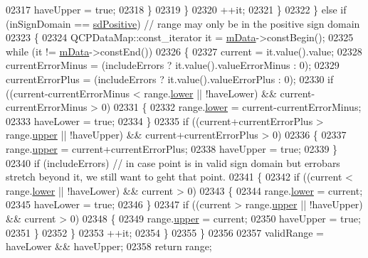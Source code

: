 \begin{DoxyCode}
02317           haveUpper = \textcolor{keyword}{true};
02318         \}
02319       \}
02320       ++it;
02321     \}
02322   \} \textcolor{keywordflow}{else} \textcolor{keywordflow}{if} (inSignDomain == \hyperlink{a00024_a661743478a1d3c09d28ec2711d7653d8a02951859f243a4d24e779cfbb5471030}{sdPositive}) \textcolor{comment}{// range may only be in the positive sign domain}
02323   \{
02324     QCPDataMap::const\_iterator it = \hyperlink{a00031_a8457c840f69a0ac49f61d30a509c5d08}{mData}->constBegin();
02325     \textcolor{keywordflow}{while} (it != \hyperlink{a00031_a8457c840f69a0ac49f61d30a509c5d08}{mData}->constEnd())
02326     \{
02327       current = it.value().value;
02328       currentErrorMinus = (includeErrors ? it.value().valueErrorMinus : 0);
02329       currentErrorPlus = (includeErrors ? it.value().valueErrorPlus : 0);
02330       \textcolor{keywordflow}{if} ((current-currentErrorMinus < range.\hyperlink{a00049_aa3aca3edb14f7ca0c85d912647b91745}{lower} || !haveLower) && current-currentErrorMinus > 0)
02331       \{
02332         range.\hyperlink{a00049_aa3aca3edb14f7ca0c85d912647b91745}{lower} = current-currentErrorMinus;
02333         haveLower = \textcolor{keyword}{true};
02334       \}
02335       \textcolor{keywordflow}{if} ((current+currentErrorPlus > range.\hyperlink{a00049_ae44eb3aafe1d0e2ed34b499b6d2e074f}{upper} || !haveUpper) && current+currentErrorPlus > 0)
02336       \{
02337         range.\hyperlink{a00049_ae44eb3aafe1d0e2ed34b499b6d2e074f}{upper} = current+currentErrorPlus;
02338         haveUpper = \textcolor{keyword}{true};
02339       \}
02340       \textcolor{keywordflow}{if} (includeErrors) \textcolor{comment}{// in case point is in valid sign domain but errobars stretch beyond it, we still
       want to geht that point.}
02341       \{
02342         \textcolor{keywordflow}{if} ((current < range.\hyperlink{a00049_aa3aca3edb14f7ca0c85d912647b91745}{lower} || !haveLower) && current > 0)
02343         \{
02344           range.\hyperlink{a00049_aa3aca3edb14f7ca0c85d912647b91745}{lower} = current;
02345           haveLower = \textcolor{keyword}{true};
02346         \}
02347         \textcolor{keywordflow}{if} ((current > range.\hyperlink{a00049_ae44eb3aafe1d0e2ed34b499b6d2e074f}{upper} || !haveUpper) && current > 0)
02348         \{
02349           range.\hyperlink{a00049_ae44eb3aafe1d0e2ed34b499b6d2e074f}{upper} = current;
02350           haveUpper = \textcolor{keyword}{true};
02351         \}
02352       \}
02353       ++it;
02354     \}
02355   \}
02356   
02357   validRange = haveLower && haveUpper;
02358   \textcolor{keywordflow}{return} range;

\end{DoxyCode}
